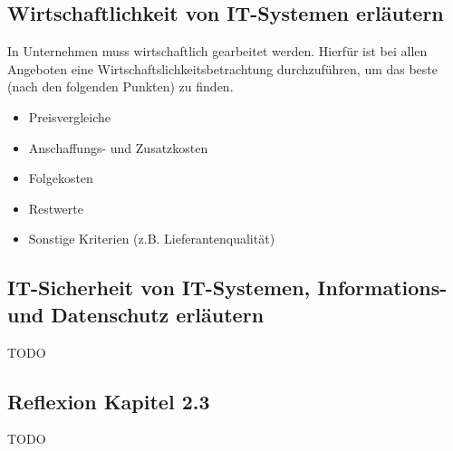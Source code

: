 \subsection{Wirtschaftlichkeit von IT-Systemen erläutern}
    \begin{subindent}
        In Unternehmen muss wirtschaftlich gearbeitet werden. Hierfür ist bei allen Angeboten eine Wirtschaftslichkeitsbetrachtung durchzuführen, um das beste (nach den folgenden Punkten) zu finden.
    \end{subindent}
    \begin{tcolorbox}[width=11cm, center, title=Wirtschaftlichkeitsbetrachtungskriterien, coltitle=white, colframe=white!20!blue, colback=white!80!blue]
        \begin{itemize}[itemsep=0.01em, parsep=0.3em]
            \item Preisvergleiche
            \item Anschaffungs- und Zusatzkosten
            \item Folgekosten
            \item Restwerte
            \item Sonstige Kriterien (z.B. Lieferantenqualität)
        \end{itemize}
    \end{tcolorbox}
\subsection{IT-Sicherheit von IT-Systemen, Informations- und Datenschutz erläutern}
    TODO
\subsection*{Reflexion Kapitel 2.3}
    \begin{refindent}
        TODO
    \end{refindent}